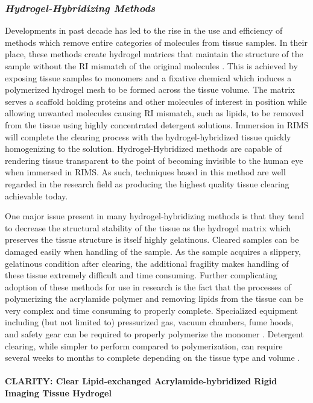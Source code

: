 \subsubsection{\textit{Hydrogel-Hybridizing Methods}}
Developments in past decade has led to the rise in the use and efficiency of methods which remove entire categories of molecules from tissue samples. In their place, these methods create hydrogel matrices that maintain the structure of the sample without the RI mismatch of the original molecules \cite{paysan_art_2023}. This is achieved by exposing tissue samples to monomers and a fixative chemical which induces a polymerized hydrogel mesh to be formed across the tissue volume. The matrix serves a scaffold holding proteins and other molecules of interest in position while allowing unwanted molecules causing RI mismatch, such as lipids, to be removed from the tissue using highly concentrated detergent solutions. Immersion in RIMS will complete the clearing process with the hydrogel-hybridized tissue quickly homogenizing to the solution. Hydrogel-Hybridized methods are capable of rendering tissue transparent to the point of becoming invisible to the human eye when immersed in RIMS. As such, techniques based in this method are well regarded in the research field as producing the highest quality tissue clearing achievable today. 

One major issue present in many hydrogel-hybridizing methods is that they tend to decrease the structural stability of the tissue as the hydrogel matrix which preserves the tissue structure is itself highly gelatinous. Cleared samples can be damaged easily when handling of the sample. As the sample acquires a slippery, gelatinous condition after clearing, the additional fragility makes handling of these tissue extremely difficult and time consuming. Further complicating adoption of these methods for use in research is the fact that the processes of polymerizing the acrylamide polymer and removing lipids from the tissue can be very complex and time consuming to properly complete. Specialized equipment including (but not limited to) pressurized gas, vacuum chambers, fume hoods, and safety gear can be required to properly polymerize the monomer \cite{olianti_optical_2021}. Detergent clearing, while simpler to perform compared to polymerization, can require several weeks to months to complete depending on the tissue type and volume .

\paragraph{CLARITY: Clear Lipid-exchanged Acrylamide-hybridized Rigid Imaging Tissue Hydrogel}

